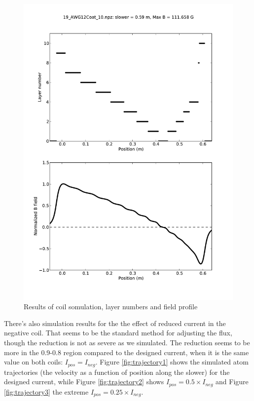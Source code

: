 \documentclass[12pt,a4paper]{article}
\begin{document}
\begin{figure}[htb]
\centering
\includegraphics[width=1.0\textwidth]{19_AWG12Coat_10}
\caption{Results of coil somulation, layer numbers and field profile}
\label{fig:simcoil}
\end{figure}

There's also simulation results for the the effect of reduced current in the negative coil. That seems to be the standard method for adjusting the flux, though the reduction is not as severe as we simulated. The reduction seems to be more in the 0.9-0.8 region compared to the designed current, when it is the same value on both coils: $I_{pos} = I_{neg}$. Figure \ref{fig:trajectory1} shows the simulated atom trajectories (the velocity as a function of position along the slower) for the designed current, while Figure \ref{fig:trajectory2} shows $I_{pos} = 0.5 \times I_{neg}$ and Figure \ref{fig:trajectory3} the extreme $I_{pos} = 0.25 \times I_{neg}$.
\end{document}
